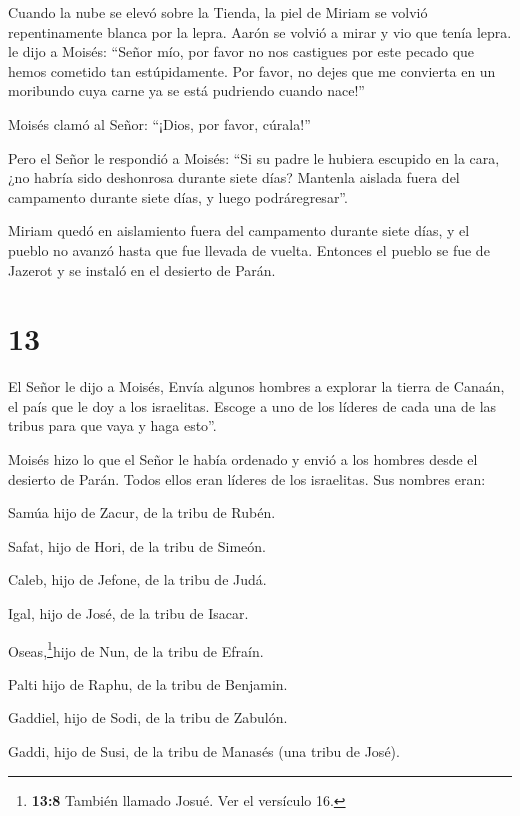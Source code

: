  Cuando la nube se elevó sobre la Tienda, la piel de Miriam
se volvió repentinamente blanca por la lepra. Aarón se volvió a mirar y
vio que tenía lepra.  le dijo a Moisés: ``Señor mío, por
favor no nos castigues por este pecado que hemos cometido tan
estúpidamente.  Por favor, no dejes que me convierta en un
moribundo cuya carne ya se está pudriendo cuando nace!''

 Moisés clamó al Señor: ``¡Dios, por favor, cúrala!''

 Pero el Señor le respondió a Moisés: ``Si su padre le
hubiera escupido en la cara, ¿no habría sido deshonrosa durante siete
días? Mantenla aislada fuera del campamento durante siete días, y luego
podráregresar''.

 Miriam quedó en aislamiento fuera del campamento durante
siete días, y el pueblo no avanzó hasta que fue llevada de vuelta.
 Entonces el pueblo se fue de Jazerot y se instaló en el
desierto de Parán.

\hypertarget{section-12}{%
\section{13}\label{section-12}}

 El Señor le dijo a Moisés,  Envía algunos
hombres a explorar la tierra de Canaán, el país que le doy a los
israelitas. Escoge a uno de los líderes de cada una de las tribus para
que vaya y haga esto''.

 Moisés hizo lo que el Señor le había ordenado y envió a los
hombres desde el desierto de Parán. Todos ellos eran líderes de los
israelitas.  Sus nombres eran:

Samúa hijo de Zacur, de la tribu de Rubén.

 Safat, hijo de Hori, de la tribu de Simeón.

 Caleb, hijo de Jefone, de la tribu de Judá.

 Igal, hijo de José, de la tribu de Isacar.

 Oseas,\footnote{\textbf{13:8} También llamado Josué. Ver el
  versículo 16.}hijo de Nun, de la tribu de Efraín.

 Palti hijo de Raphu, de la tribu de Benjamin.

 Gaddiel, hijo de Sodi, de la tribu de Zabulón.

 Gaddi, hijo de Susi, de la tribu de Manasés (una tribu de
José).

